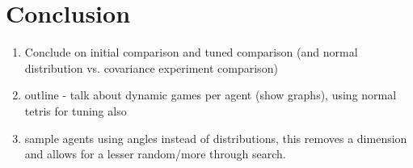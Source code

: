 \section{Conclusion}
\begin{enumerate}
\item Conclude on initial comparison and tuned comparison (and normal distribution vs. covariance experiment comparison)
\item outline - talk about dynamic games per agent (show graphs), using normal tetris for 
tuning also
\item sample agents using angles instead of distributions, this removes a dimension and allows for a lesser random/more through search.
\end{enumerate}

